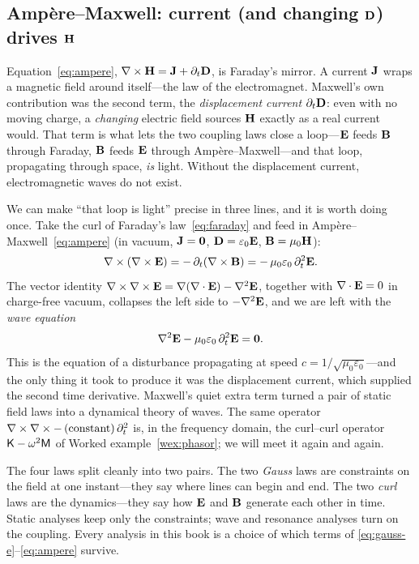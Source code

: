 \subsection{Amp\`ere--Maxwell: current (and changing \texorpdfstring{$\mathbf{D}$}{D}) drives \texorpdfstring{$\mathbf{H}$}{H}}

Equation~\eqref{eq:ampere}, $\nabla\times\mathbf{H}=\mathbf{J}+\partial_t\mathbf{D}$, is Faraday's mirror.
A current $\mathbf{J}$ wraps a magnetic field around itself---the law of the
electromagnet. Maxwell's own contribution was the second term, the
\emph{displacement current} $\partial_t\mathbf{D}$: even with no moving charge, a
\emph{changing} electric field sources $\mathbf{H}$ exactly as a real current would.
That term is what lets the two coupling laws close a loop---$\mathbf{E}$ feeds $\mathbf{B}$
through Faraday, $\mathbf{B}$ feeds $\mathbf{E}$ through Amp\`ere--Maxwell---and that loop,
propagating through space, \emph{is} light. Without the displacement current,
electromagnetic waves do not exist.

We can make ``that loop is light'' precise in three lines, and it is worth
doing once. Take the curl of Faraday's law~\eqref{eq:faraday} and feed in
Amp\`ere--Maxwell~\eqref{eq:ampere} (in vacuum, $\mathbf{J}=\bm0$,
$\mathbf{D}=\varepsilon_0\mathbf{E}$, $\mathbf{B}=\mu_0\mathbf{H}$):
\[
  \nabla\times(\nabla\times\mathbf{E})
    = -\,\partial_t(\nabla\times\mathbf{B})
    = -\,\mu_0\varepsilon_0\,\partial_t^2\mathbf{E}.
\]
The vector identity $\nabla\times\nabla\times\mathbf{E}=\nabla(\nabla\cdot\mathbf{E})-\nabla^2\mathbf{E}$, together with
$\nabla\cdot\mathbf{E}=0$ in charge-free vacuum, collapses the left side to $-\nabla^2\mathbf{E}$, and we
are left with the \emph{wave equation}
\begin{equation}
  \nabla^2\mathbf{E} - \mu_0\varepsilon_0\,\partial_t^2\mathbf{E} = \bm0. \label{eq:waveeq}
\end{equation}
This is the equation of a disturbance propagating at speed
$c=1/\sqrt{\mu_0\varepsilon_0}$---and the only thing it took to produce it was
the displacement current, which supplied the second time derivative. Maxwell's
quiet extra term turned a pair of static field laws into a dynamical theory of
waves. The same operator $\nabla\times\nabla\times-\,(\text{constant})\,\partial_t^2$ is, in
the frequency domain, the curl--curl operator $\mathsf{K}-\omega^2\mathsf{M}$ of
Worked example~\ref{wex:phasor}; we will meet it again and again.

\begin{keyidea}
The four laws split cleanly into two pairs. The two \emph{Gauss} laws are
constraints on the field at one instant---they say where lines can begin and
end. The two \emph{curl} laws are the dynamics---they say how $\mathbf{E}$ and $\mathbf{B}$
generate each other in time. Static analyses keep only the constraints; wave
and resonance analyses turn on the coupling. Every analysis in this book is a
choice of which terms of \eqref{eq:gauss-e}--\eqref{eq:ampere} survive.
\end{keyidea}

